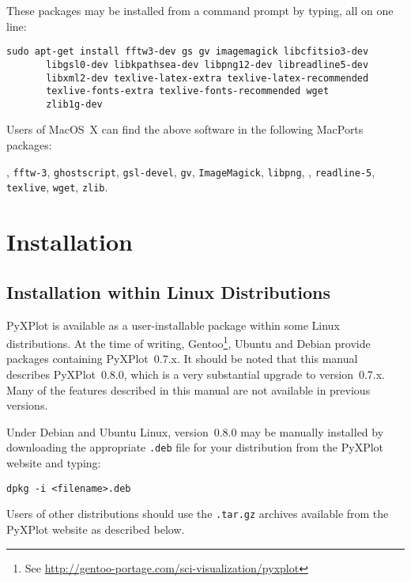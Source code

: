 \noindent These packages may be installed from a command prompt by typing, all on one line:

\begin{verbatim}
sudo apt-get install fftw3-dev gs gv imagemagick libcfitsio3-dev
       libgsl0-dev libkpathsea-dev libpng12-dev libreadline5-dev
       libxml2-dev texlive-latex-extra texlive-latex-recommended
       texlive-fonts-extra texlive-fonts-recommended wget
       zlib1g-dev
\end{verbatim}

Users of MacOS~X can find the above software in the following MacPorts packages:

\vspace{2mm}
, {\tt fftw-3}, {\tt ghostscript}, {\tt gsl-devel}, {\tt gv}, {\tt ImageMagick}, {\tt libpng},\newline
{}, {\tt readline-5}, {\tt texlive}, {\tt wget}, {\tt zlib}.
\vspace{2mm}

\section{Installation}

\subsection{Installation within Linux Distributions}

PyXPlot is available as a user-installable package within some Linux
distributions. At the time of writing, Gentoo\footnote{See
\url{http://gentoo-portage.com/sci-visualization/pyxplot}}, Ubuntu and Debian provide packages containing
PyXPlot~0.7.x. It should be noted that this manual describes PyXPlot~0.8.0,
which is a very substantial upgrade to version~0.7.x. Many of the features
described in this manual are not available in previous versions.

Under Debian and Ubuntu Linux, version~0.8.0 may be manually installed by
downloading the appropriate {\tt .deb} file for your distribution from the
PyXPlot website and typing:

\begin{verbatim}
dpkg -i <filename>.deb
\end{verbatim}

Users of other distributions should use the {\tt .tar.gz} archives available
from the PyXPlot website as described below.

